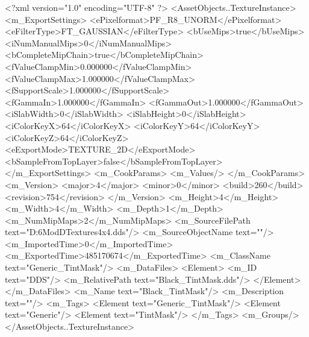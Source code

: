 <?xml version="1.0" encoding="UTF-8" ?>
<AssetObjects..TextureInstance>
	<m_ExportSettings>
		<ePixelformat>PF_R8_UNORM</ePixelformat>
		<eFilterType>FT_GAUSSIAN</eFilterType>
		<bUseMips>true</bUseMips>
		<iNumManualMips>0</iNumManualMips>
		<bCompleteMipChain>true</bCompleteMipChain>
		<fValueClampMin>0.000000</fValueClampMin>
		<fValueClampMax>1.000000</fValueClampMax>
		<fSupportScale>1.000000</fSupportScale>
		<fGammaIn>1.000000</fGammaIn>
		<fGammaOut>1.000000</fGammaOut>
		<iSlabWidth>0</iSlabWidth>
		<iSlabHeight>0</iSlabHeight>
		<iColorKeyX>64</iColorKeyX>
		<iColorKeyY>64</iColorKeyY>
		<iColorKeyZ>64</iColorKeyZ>
		<eExportMode>TEXTURE_2D</eExportMode>
		<bSampleFromTopLayer>false</bSampleFromTopLayer>
	</m_ExportSettings>
	<m_CookParams>
		<m_Values/>
	</m_CookParams>
	<m_Version>
		<major>4</major>
		<minor>0</minor>
		<build>260</build>
		<revision>754</revision>
	</m_Version>
	<m_Height>4</m_Height>
	<m_Width>4</m_Width>
	<m_Depth>1</m_Depth>
	<m_NumMipMaps>2</m_NumMipMaps>
	<m_SourceFilePath text="D:\Civ6Mod\3D\Util Textures\black4x4.dds"/>
	<m_SourceObjectName text=""/>
	<m_ImportedTime>0</m_ImportedTime>
	<m_ExportedTime>485170674</m_ExportedTime>
	<m_ClassName text="Generic_TintMask"/>
	<m_DataFiles>
		<Element>
			<m_ID text="DDS"/>
			<m_RelativePath text="Black_TintMask.dds"/>
		</Element>
	</m_DataFiles>
	<m_Name text="Black_TintMask"/>
	<m_Description text=""/>
	<m_Tags>
		<Element text="Generic_TintMask"/>
		<Element text="Generic"/>
		<Element text="TintMask"/>
	</m_Tags>
	<m_Groups/>
</AssetObjects..TextureInstance>

 